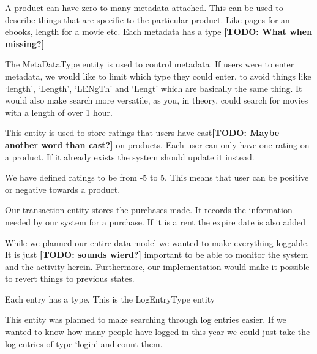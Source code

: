 A product can have zero-to-many metadata attached. This can be used to describe things that are specific to the particular product. Like pages for an ebooks, length for a movie etc. Each metadata has a type \textbf{[TODO: What when missing?]}

The MetaDataType entity is used to control metadata. If users were to enter metadata, we would like to limit which type they could enter, to avoid things like `length', `Length', `LENgTh' and `Lengt' which are basically the same thing. It would also make search more versatile, as you, in theory, could search for movies with a length of over 1 hour.

This entity is used to store ratings that users have cast\textbf{[TODO: Maybe another word than cast?]} on products. Each user can only have one rating on a product. If it already exists the system should update it instead.

We have defined ratings to be from -5 to 5. This means that user can be positive or negative towards a product.

Our transaction entity stores the purchases made. It records the information needed by our system for a purchase. If it is a rent the expire date is also added

While we planned our entire data model we wanted to make everything loggable. It is just \textbf{[TODO: sounds wierd?]} important to be able to monitor the system and the activity herein. Furthermore, our implementation would make it possible to revert things to previous states.

Each entry has a type. This is the LogEntryType entity

This entity was planned to make searching through log entries easier. If we wanted to know how many people have logged in this year we could just take the log entries of type `login' and count them.